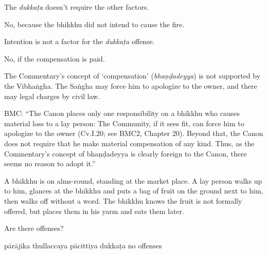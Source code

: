 \begin{exam}{\autoExamName}
\begin{problem}
\begin{manswers}{1}
    \begin{solution}
      The \emph{dukkaṭa} doesn't require the other factors.
    \end{solution}

     No, because the bhikkhu did not intend to cause the fire. \eAns

    \begin{solution}
      Intention is not a factor for the \emph{dukkaṭa} offense.
    \end{solution}

     No, if the compensation is paid. \eAns

    \begin{solution}
      The Commentary's concept of `compensation' (\emph{bhaṇḍadeyya}) is not supported by the Vibhaṅgha.
      The Saṅgha may force him to apologize to the owner, and there may legal charges by civil law.

      BMC: ``The Canon places only one responsibility on a bhikkhu who causes material loss to a lay person: The Community, if it sees fit, can force him to apologize to the owner (Cv.I.20; see BMC2, Chapter 20). Beyond that, the Canon does not require that he make material compensation of any kind. Thus, as the Commentary's concept of bhaṇḍadeyya is clearly foreign to the Canon, there seems no reason to adopt it.''
    \end{solution}

    \eChoices
  \end{manswers}

\end{problem}

\clearpage

\begin{problem}

  A bhikkhu is on alms-round, standing at the market place.
  A lay person walks up to him,
  glances at the bhikkhu and puts a bag of fruit on the ground next to him,
  then walks off without a word.
  The bhikkhu knows the fruit is not formally offered,
  but places them in his yarm and eats them later.

  Are there offenses?

  \bigskip

  \begin{answers}{5}
    \bChoices
     pārājika\eAns
     thullaccaya\eAns
     pācittiya\eAns
     dukkaṭa\eAns
     no offenses\eAns
    \eChoices
  \end{answers}


\end{problem}
\end{exam}
